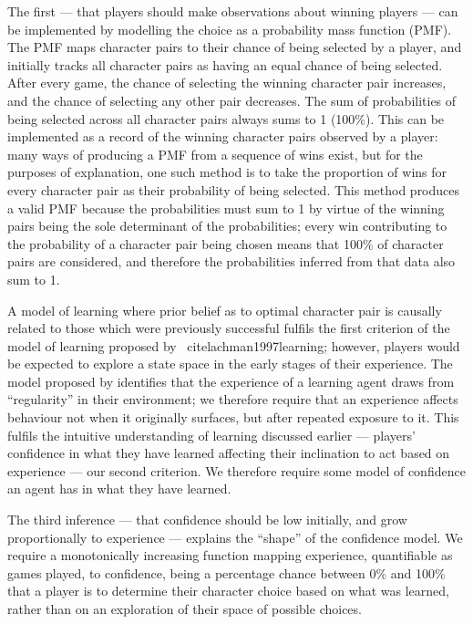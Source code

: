 The first --- that players should make observations about winning players ---
can be implemented by modelling the choice as a probability mass function (PMF).
The PMF maps character pairs to their chance of being selected by a player, and
initially tracks all character pairs as having an equal chance of being
selected. After every game, the chance of selecting the winning character pair
increases, and the chance of selecting any other pair decreases. The sum of
probabilities of being selected across all character pairs always sums to 1
(100\%). This can be implemented as a record of the winning character pairs
observed by a player: many ways of producing a PMF from a sequence of wins
exist, but for the purposes of explanation, one such method is to take the
proportion of wins for every character pair as their probability of being
selected. This method produces a valid PMF because the probabilities must sum to
1 by virtue of the winning pairs being the sole determinant of the
probabilities; every win contributing to the probability of a character pair
being chosen means that 100\% of character pairs are considered, and therefore
the probabilities inferred from that data also sum to 1.

A model of learning where prior belief as to optimal character pair is causally
related to those which were previously successful fulfils the first criterion of
the model of learning proposed by
\citeauthor{lachman1997learning}~cite{lachman1997learning}; however, players
would be expected to explore a state space in the early stages of their
experience. The model proposed by \citeauthor{lachman1997learning} identifies
that the experience of a learning agent draws from ``regularity'' in their
environment; we therefore require that an experience affects behaviour not when
it originally surfaces, but after repeated exposure to it. This fulfils the
intuitive understanding of learning discussed earlier --- players' confidence in
what they have learned affecting their inclination to act based on experience
--- our second criterion. We therefore require some model of confidence an agent
has in what they have learned.

The third inference --- that confidence should be low initially, and grow
proportionally to experience --- explains the ``shape'' of the confidence model.
We require a monotonically increasing function mapping experience, quantifiable
as games played, to confidence, being a percentage chance between 0\% and 100\%
that a player is to determine their character choice based on what was learned,
rather than on an exploration of their space of possible choices.

